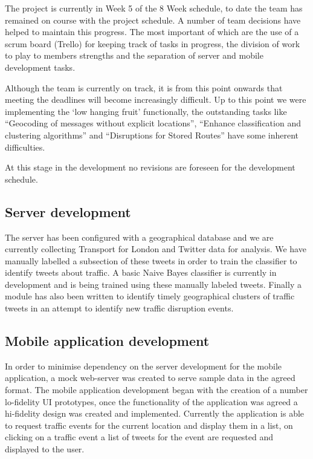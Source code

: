 The project is currently in Week 5 of the 8 Week schedule, to date the team has
remained on course with the project schedule. A number of team decisions have
helped to maintain this progress. The most important of which are the use of a
scrum board (Trello) for keeping track of tasks in progress, the division of
work to play to members strengths and the separation of server and mobile
development tasks.

Although the team is currently on track, it is from this point onwards that
meeting the deadlines will become increasingly difficult. Up to this point we
were implementing the ‘low hanging fruit’ functionally, the outstanding tasks
like “Geocoding of messages without explicit locations”, “Enhance
classification and clustering algorithms” and “Disruptions for Stored Routes”
have some inherent difficulties.

At this stage in the development no revisions are foreseen for the development
schedule.

\subsection{Server development}

The server has been configured with a geographical database and we are
currently collecting Transport for London and Twitter data for analysis. We
have manually labelled a subsection of these tweets in order to train the
classifier to identify tweets about traffic. A basic Naive Bayes classifier is
currently in development and is being trained using these manually labeled
tweets. Finally a module has also been written to identify timely geographical
clusters of traffic tweets in an attempt to identify new traffic disruption
events.

\subsection{Mobile application development}

In order to minimise dependency on the server development for the mobile
application, a  mock web-server was created to serve sample data in the agreed
format. The mobile application development began with the creation of a number
lo-fidelity UI prototypes, once the functionality of the application was agreed
a hi-fidelity design was created and implemented. Currently the application is
able to request traffic events for the current location and display them in a
list, on clicking on a traffic event a list of tweets for the event are
requested and displayed to the user. 
